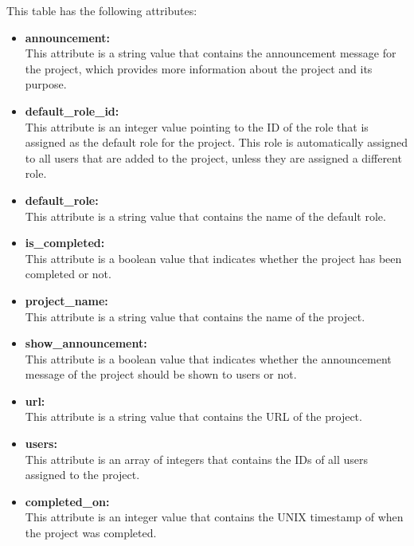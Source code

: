 This table has the following attributes:~\cite{TRProjects}
\begin{itemize}
    \item \textbf{announcement:} \\
    This attribute is a string value that contains the announcement message for the project, which provides more information about the project and its purpose.

    \item \textbf{default_role_id:} \\
    This attribute is an integer value pointing to the ID of the role that is assigned as the default role for the project. This role is automatically assigned to all users that are added to the project, unless they are assigned a different role.

    \item \textbf{default_role:} \\
    This attribute is a string value that contains the name of the default role.

    \item \textbf{is_completed:} \\
    This attribute is a boolean value that indicates whether the project has been completed or not.

    \item \textbf{project_name:} \\
    This attribute is a string value that contains the name of the project.

    \item \textbf{show_announcement:} \\
    This attribute is a boolean value that indicates whether the announcement message of the project should be shown to users or not.

    \item \textbf{url:} \\
    This attribute is a string value that contains the URL of the project.

    \item \textbf{users:} \\
    This attribute is an array of integers that contains the IDs of all users assigned to the project.

    \item \textbf{completed_on:} \\
    This attribute is an integer value that contains the UNIX timestamp of when the project was completed.
\end{itemize}

